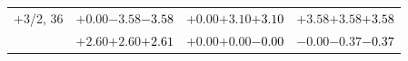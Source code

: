 \documentclass[compress]{beamer}
\begin{document}
\begin{frame}
\begin{tabular}{r | c | c | c}
$+$3/2, 36 & $+0.00$\hspace{0.1 cm}$-3.58$\hspace{0.1 cm}\textcolor{black}{$-3.58$} & $+0.00$\hspace{0.1 cm}$+3.10$\hspace{0.1 cm}\textcolor{black}{$+3.10$} & $+3.58$\hspace{0.1 cm}$+3.58$\hspace{0.1 cm}\textcolor{black}{$+3.58$} \\
           & $+2.60$\hspace{0.1 cm}$+2.60$\hspace{0.1 cm}\textcolor{black}{$+2.61$} & $+0.00$\hspace{0.1 cm}$+0.00$\hspace{0.1 cm}\textcolor{black}{$-0.00$} & $-0.00$\hspace{0.1 cm}$-0.37$\hspace{0.1 cm}\textcolor{black}{$-0.37$} \\
\end{tabular}
\end{frame}
\end{document}
